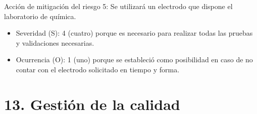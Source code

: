 \documentclass[11pt]{charter}
\begin{document}
Acción de mitigación del riesgo 5: Se utilizará un electrodo que dispone el laboratorio de química.
\begin{itemize}
\item Severidad (S): 4 (cuatro) porque es necesario para realizar todas las pruebas y validaciones necesarias.
\item Ocurrencia (O): 1 (uno) porque se estableció como posibilidad en caso de no contar con el electrodo solicitado en tiempo y forma.
\end{itemize}



\section{13. Gestión de la calidad}
\label{sec:calidad}
\end{document}
